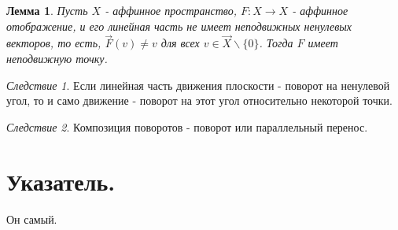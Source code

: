 \documentclass[a4paper,100pt]{article}
\theoremstyle{indented}
\newtheorem{lemma}{Лемма}
\theoremstyle{definition}
\theoremstyle{remark}
\newtheorem{cons}{Следствие}
\DeclareMathOperator{\ra}{\rightarrow}
\begin{document}
\begin{lemma}
    Пусть $X$ - аффинное пространство, $F:X\ra X$ - аффинное отображение, и его линейная часть не имеет неподвижных ненулевых векторов, то есть, $\vec{F}(v)\neq v$ для всех $v\in \vec{X}\backslash \{0\}$. Тогда $F$ имеет неподвижную точку. 
\end{lemma}

\begin{cons}
    Если линейная часть движения плоскости - поворот на ненулевой угол, то и само движение - поворот на этот угол относительно некоторой точки.
\end{cons}

\begin{cons}
    Композиция поворотов - поворот или параллельный перенос.
\end{cons}

\newpage

\section{Указатель.}

\hypertarget{t2}{Он самый.}
\end{document}
